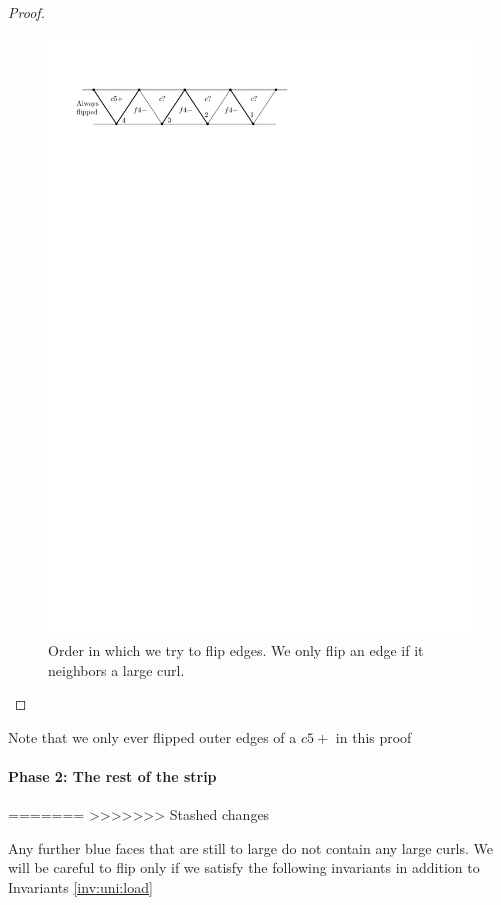 \begin{proof}
  \begin{figure}[h]
    \centering
    \includegraphics[scale=1]{unifiedAlgo/img/placeEdges}
    \caption{Order in which we try to flip edges. We only flip an edge if it neighbors a large curl.}
    \label{fig:uni:placeedges}
  \end{figure}

\end{proof}

  Note that we only ever flipped outer edges of a $c5+$ in this proof


\paragraph{Phase 2: The rest of the strip}
=======
>>>>>>> Stashed changes

Any further blue faces that are still to large do not contain any large curls. We will be careful to flip only if we satisfy the following invariants in addition to Invariants \ref{inv:uni:load}


